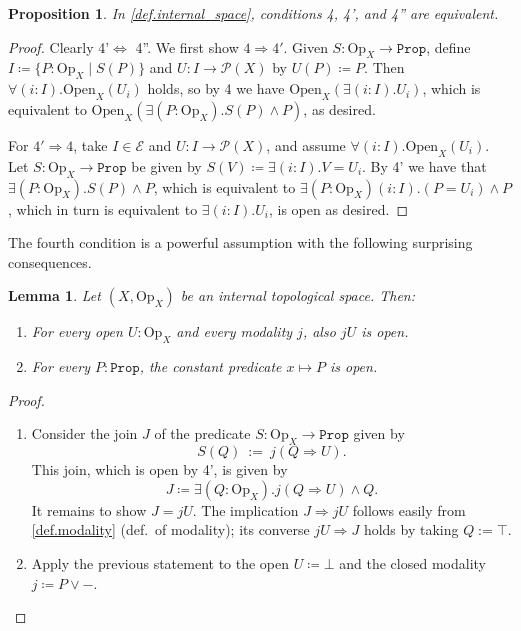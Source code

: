 \documentclass[11pt, oneside, article]{memoir}
\theoremstyle{plain}
\newtheorem{proposition}[theorem]{Proposition}
\newtheorem{lemma}[theorem]{Lemma}
\theoremstyle{definition}
\theoremstyle{remark}
\newcommand{\const}[1]{\mathtt{#1}}
\newcommand{\Set}[1]{\mathrm{#1}}
\newcommand{\cat}[1]{\mathcal{#1}}
\newcommand{\pow}{\mathcal{P}}
\newcommand{\prop}{\const{Prop}}
\newcommand{\Op}{\Set{Op}}
\newcommand{\Open}{\Set{Open}}
\newcommand{\imp}{\Rightarrow}
\renewcommand{\iff}{\Leftrightarrow}
\begin{document}
\begin{proposition}
In \cref{def.internal_space}, conditions 4, 4', and 4'' are equivalent.
\end{proposition}
\begin{proof}
Clearly 4'$\iff$ 4''. We first show $4\imp 4'$. Given $S\colon\Op_X\to\prop$, define $I\coloneqq\{P:\Op_X\mid S(P)\}$ and $U\colon I\to\pow(X)$ by $U(P)\coloneqq P$. Then $\forall(i:I).\Open_X(U_i)$ holds, so by 4 we have $\Open_X(\exists(i:I).U_i)$, which is equivalent to $\Open_X(\exists(P:\Op_X).S(P)\wedge P)$, as desired.

For $4'\imp 4$, take $I\in\cat{E}$ and $U\colon I\to\pow(X)$, and assume $\forall(i:I).\Open_X(U_i)$. Let $S\colon\Op_X\to\prop$ be given by $S(V)\coloneqq\exists(i:I).V=U_i$. By 4' we have that $\exists(P:\Op_X).S(P)\wedge P$, which is equivalent to $\exists(P:\Op_X)(i:I).(P=U_i)\wedge P$, which in turn is equivalent to $\exists(i:I).U_i$, is open as desired.
\end{proof}

The fourth condition is a powerful assumption with the following surprising consequences.

\begin{lemma}
	\label{props_open}
	Let $(X,\Op_X)$ be an internal topological space. Then:
	\begin{enumerate}
		\item For every open $U : \Op_X$ and every modality $j$, also $jU$ is open.
		\item For every $P : \prop$, the constant predicate $x \mapsto P$ is open.
	\end{enumerate}
\end{lemma}

\begin{proof}
	\begin{enumerate}
		\item Consider the join $J$ of the predicate $S : \Op_X \to \prop$ given by
			\[
				S(Q) \: := \: j(Q \Rightarrow U).
			\]
			This join, which is open by 4', is given by
			\[
				J\coloneqq\exists(Q : \Op_X) . j(Q \Rightarrow U) \land Q.
			\]
			It remains to show $J=jU$. The implication $J\imp jU$ follows easily from \cref{def.modality} (def.\ of modality); its converse $jU\imp J$ holds by taking $Q := \top$.
		\item Apply the previous statement to the open $U\coloneqq\bot$ and the closed modality $j\coloneqq P \lor -$. \qedhere
	\end{enumerate}
\end{proof}
\end{document}
